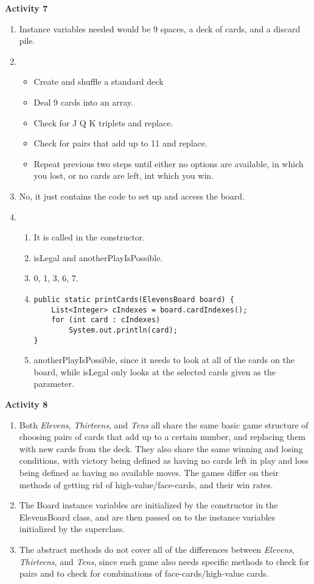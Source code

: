 \documentclass[12pt]{article}
\begin{document}
\textbf{Activity 7}
\begin{enumerate}
\item Instance variables needed would be 9 spaces, a deck of cards, and a
  discard pile. 
\item \begin{itemize}
      \item Create and shuffle a standard deck
      \item Deal 9 cards into an array.
      \item Check for J Q K triplets and replace.
      \item Check for pairs that add up to 11 and replace.
      \item Repeat previous two steps until either no options are available, in
        which you lost, or no cards are left, int which you win.
      \end{itemize}
\item No, it just contains the code to set up and access the board.
\item \begin{enumerate}
      \item It is called in the constructor.
      \item isLegal and anotherPlayIsPossible.
      \item 0, 1, 3, 6, 7.
      \item
      \begin{verbatim}
public static printCards(ElevensBoard board) {
    List<Integer> cIndexes = board.cardIndexes();
    for (int card : cIndexes)
        System.out.println(card);
}
      \end{verbatim}
      \item anotherPlayIsPossible, since it needs to look at all of the cards on
        the board, while isLegal only looks at the selected cards given as the
        parameter. 
      \end{enumerate}
\end{enumerate}


\textbf{Activity 8}
\begin{enumerate}
\item Both \textit{Elevens}, \textit{Thirteens}, and \textit{Tens} all share the
  same basic game structure of choosing pairs of cards that add up to a certain
  number, and replacing them with new cards from the deck. They also share the
  same winning and losing conditions, with victory being defined as having no
  cards left in play and loss being defined as having no available moves. The
  games differ on their methods of getting rid of high-value/face-cards, and
  their win rates.
\item The Board instance variables are initialized by the constructor in the
  ElevensBoard class, and are then passed on to the instance variables
  initialized by the superclass. 
\item The abstract methods do not cover all of the differences between
  \textit{Elevens}, \textit{Thirteens}, and \textit{Tens}, since each game also
  needs specific methods to check for pairs and to check for combinations of
  face-cards/high-value cards.
\end{enumerate}
\end{document}

